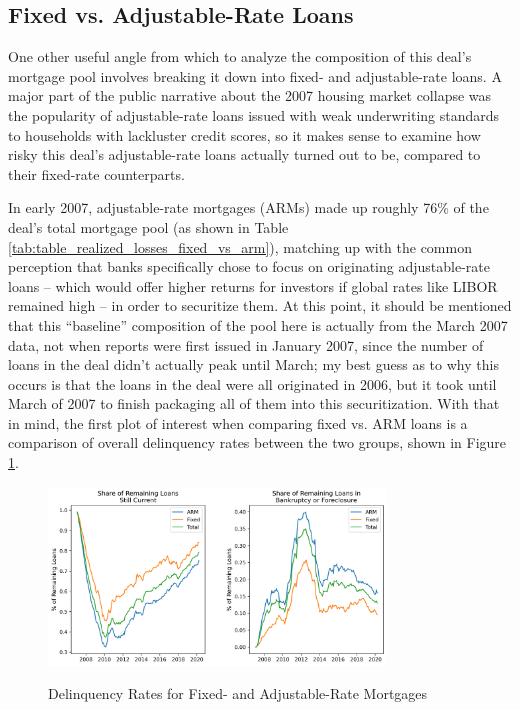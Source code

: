 \documentclass[12pt]{article}
\begin{document}
\subsection*{Fixed vs. Adjustable-Rate Loans}

One other useful angle from which to analyze the composition of this deal’s mortgage pool involves breaking it down into fixed- and adjustable-rate loans. A major part of the public narrative about the 2007 housing market collapse was the popularity of adjustable-rate loans issued with weak underwriting standards to households with lackluster credit scores, so it makes sense to examine how risky this deal’s adjustable-rate loans actually turned out to be, compared to their fixed-rate counterparts.

In early 2007, adjustable-rate mortgages (ARMs) made up roughly 76\% of the deal's total mortgage pool (as shown in Table \ref{tab:table_realized_losses_fixed_vs_arm}), matching up with the common perception that banks specifically chose to focus on originating adjustable-rate loans – which would offer higher returns for investors if global rates like LIBOR remained high – in order to securitize them. At this point, it should be mentioned that this “baseline” composition of the pool here is actually from the March 2007 data, not when reports were first issued in January 2007, since the number of loans in the deal didn’t actually peak until March; my best guess as to why this occurs is that the loans in the deal were all originated in 2006, but it took until March of 2007 to finish packaging all of them into this securitization. With that in mind, the first plot of interest when comparing fixed vs. ARM loans is a comparison of overall delinquency rates between the two groups, shown in Figure \ref{fig:timeseries_delinq_stats_fixed_vs_arm}.

\begin{figure}[h]
	\centering
	\caption{Delinquency Rates for Fixed- and Adjustable-Rate Mortgages}
	\includegraphics[width=0.8\textwidth]{../figures/timeseries_delinq_status_fixed_vs_arm}
	\label{fig:timeseries_delinq_stats_fixed_vs_arm}
\end{figure}
\end{document}
